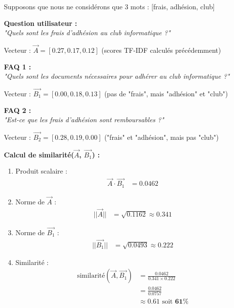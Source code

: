 \documentclass[11pt,a4paper]{article}
\begin{document}
\begin{exemple}

Supposons que nous ne considérons que 3 mots : [frais, adhésion, club]

\vspace{0.3cm}
\textbf{Question utilisateur :} \\
\textit{"Quels sont les frais d'adhésion au club informatique ?"}

Vecteur : $\vec{A} = [0.27, 0.17, 0.12]$ (scores TF-IDF calculés précédemment)

\vspace{0.3cm}
\textbf{FAQ 1 :} \\
\textit{"Quels sont les documents nécessaires pour adhérer au club informatique ?"}

Vecteur : $\vec{B_1} = [0.00, 0.18, 0.13]$ (pas de "frais", mais "adhésion" et "club")

\vspace{0.3cm}
\textbf{FAQ 2 :} \\
\textit{"Est-ce que les frais d'adhésion sont remboursables ?"}

Vecteur : $\vec{B_2} = [0.28, 0.19, 0.00]$ ("frais" et "adhésion", mais pas "club")

\textbf{Calcul de similarité($\vec{A}$, $\vec{B_1}$) :}

\begin{enumerate}
    \item Produit scalaire : 
    \begin{align*}
    \vec{A} \cdot \vec{B_1} 
    &= 0.0462
    \end{align*}
    
    \item Norme de $\vec{A}$ :
    \begin{align*}
    ||\vec{A}|| 
    &= \sqrt{0.1162} \approx 0.341
    \end{align*}
    
    \item Norme de $\vec{B_1}$ :
    \begin{align*}
    ||\vec{B_1}|| 
    &= \sqrt{0.0493} \approx 0.222
    \end{align*}
    
    \item Similarité :
    \begin{align*}
    \text{similarité}(\vec{A}, \vec{B_1}) &= \frac{0.0462}{0.341 \times 0.222} \\
    &= \frac{0.0462}{0.0757} \\
    &\approx 0.61 \text{ soit } \mathbf{61\%}
    \end{align*}
\end{enumerate}


\end{exemple}
\end{document}
